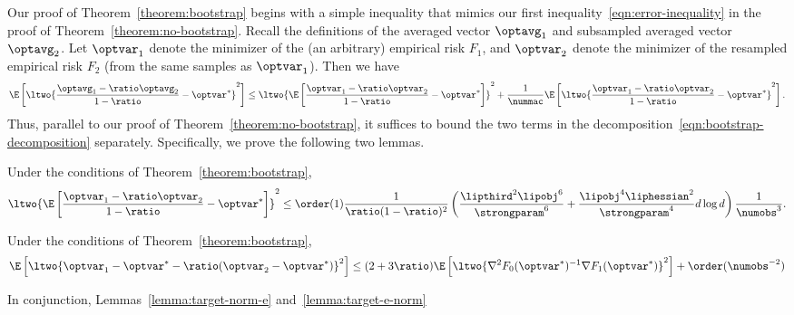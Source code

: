 \documentclass[11pt,twoside]{article}
\theoremstyle{definition}
\begin{document}
\newcommand{\remainder}{\ensuremath{\mathcal{R}}}
\newcommand{\optvector}{\optvar}

Our proof of Theorem~\ref{theorem:bootstrap} begins with a simple inequality
that mimics our first inequality~\eqref{eqn:error-inequality} in the proof of
Theorem~\ref{theorem:no-bootstrap}. Recall the definitions of the averaged
vector $\optavg_1$ and subsampled averaged vector $\optavg_2$. Let
$\optvector_1$ denote the minimizer of the (an arbitrary) empirical risk
$F_1$, and $\optvector_2$ denote the minimizer of the resampled empirical risk
$F_2$ (from the same samples as $\optvector_1$). Then we have
\begin{equation}
  \E\left[\ltwo{\frac{\optavg_1 - \ratio \optavg_2}{1 - \ratio}
      - \optvar^*}^2\right]
  \le \ltwo{\E\left[\frac{\optvar_1 - \ratio \optvar_2}{1 - \ratio}
      - \optvar^*
      \right]}^2
  + \frac{1}{\nummac}
  \E\left[\ltwo{\frac{\optvector_1 - \ratio \optvar_2}{1 - \ratio}
      - \optvar^*}^2\right].
  \label{eqn:bootstrap-decomposition}
\end{equation}
Thus, parallel to our proof of Theorem~\ref{theorem:no-bootstrap}, it
suffices to bound the two terms in the
decomposition~\eqref{eqn:bootstrap-decomposition}
separately. Specifically, we prove the following two lemmas.
\begin{lemma}
  \label{lemma:target-norm-e}
  Under the conditions of Theorem~\ref{theorem:bootstrap},
  \begin{equation}
    \label{eqn:target-norm-e}
    \ltwo{\E\left[\frac{\optvector_1 - \ratio\optvector_2}{1 - \ratio}
        -\optvector^* \right]}^2
    \le \order(1)
    \frac{1}{\ratio(1 - \ratio)^2}
    \left(\frac{\lipthird^2 \lipobj^6}{\strongparam^6}
    + \frac{\lipobj^4 \liphessian^2}{\strongparam^4} d \log d\right)
    \frac{1}{\numobs^3}.
  \end{equation}
\end{lemma}
\begin{lemma}
  \label{lemma:target-e-norm}
  Under the conditions of Theorem~\ref{theorem:bootstrap},
  \begin{equation}
    \label{eqn:target-e-norm}
    \E\left[\ltwo{\optvar_1 - \optvar^* - \ratio(\optvar_2
        - \optvar^*)}^2\right]
      \le (2+3\ratio)\E\left[
        \ltwo{\nabla^2 F_0(\optvar^*)^{-1}\nabla F_1(\optvar^*)}^2\right]
      + \order(\numobs^{-2})
  \end{equation}
\end{lemma}
\noindent
In conjunction, Lemmas~\ref{lemma:target-norm-e} and~\ref{lemma:target-e-norm}
\end{document}
